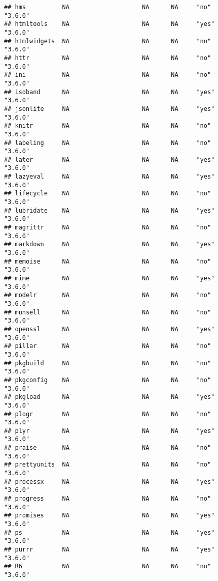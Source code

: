 \documentclass[]{book}
\begin{document}
\begin{verbatim}
## hms          NA                    NA      NA     "no"             "3.6.0"
## htmltools    NA                    NA      NA     "yes"            "3.6.0"
## htmlwidgets  NA                    NA      NA     "no"             "3.6.0"
## httr         NA                    NA      NA     "no"             "3.6.0"
## ini          NA                    NA      NA     "no"             "3.6.0"
## isoband      NA                    NA      NA     "yes"            "3.6.0"
## jsonlite     NA                    NA      NA     "yes"            "3.6.0"
## knitr        NA                    NA      NA     "no"             "3.6.0"
## labeling     NA                    NA      NA     "no"             "3.6.0"
## later        NA                    NA      NA     "yes"            "3.6.0"
## lazyeval     NA                    NA      NA     "yes"            "3.6.0"
## lifecycle    NA                    NA      NA     "no"             "3.6.0"
## lubridate    NA                    NA      NA     "yes"            "3.6.0"
## magrittr     NA                    NA      NA     "no"             "3.6.0"
## markdown     NA                    NA      NA     "yes"            "3.6.0"
## memoise      NA                    NA      NA     "no"             "3.6.0"
## mime         NA                    NA      NA     "yes"            "3.6.0"
## modelr       NA                    NA      NA     "no"             "3.6.0"
## munsell      NA                    NA      NA     "no"             "3.6.0"
## openssl      NA                    NA      NA     "yes"            "3.6.0"
## pillar       NA                    NA      NA     "no"             "3.6.0"
## pkgbuild     NA                    NA      NA     "no"             "3.6.0"
## pkgconfig    NA                    NA      NA     "no"             "3.6.0"
## pkgload      NA                    NA      NA     "yes"            "3.6.0"
## plogr        NA                    NA      NA     "no"             "3.6.0"
## plyr         NA                    NA      NA     "yes"            "3.6.0"
## praise       NA                    NA      NA     "no"             "3.6.0"
## prettyunits  NA                    NA      NA     "no"             "3.6.0"
## processx     NA                    NA      NA     "yes"            "3.6.0"
## progress     NA                    NA      NA     "no"             "3.6.0"
## promises     NA                    NA      NA     "yes"            "3.6.0"
## ps           NA                    NA      NA     "yes"            "3.6.0"
## purrr        NA                    NA      NA     "yes"            "3.6.0"
## R6           NA                    NA      NA     "no"             "3.6.0"

\end{verbatim}
\end{document}
